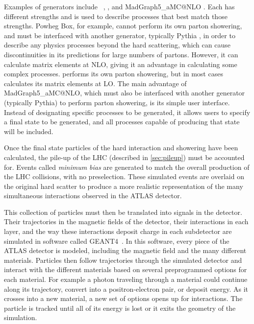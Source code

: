 Examples of generators include \sherpa~\cite{sherpa},  \cite{PowhegBOX1,PowhegBOX2,PowhegBOX3}, and {\sc MadGraph5\_aMC@NLO} \cite{Alwall:2014hca}. Each has different strengths and is used to describe processes that best match those strengths. {\sc Powheg Box}, for example, cannot perform its own parton showering, and must be interfaced with another generator, typically {\sc Pythia} \cite{Sjostrand:2006za}, in order to describe any physics processes beyond the hard scattering, which can cause discontinuities in its predictions for large numbers of partons. However, it can calculate matrix elements at \ac{NLO}, giving it an advantage in calculating some complex processes. \sherpa performs its own parton showering, but in most cases calculates its matrix elements at \ac{LO}. The main advantage of {\sc MadGraph5\_aMC@NLO}, which must also be interfaced with another generator (typically {\sc Pythia}) to perform parton showering, is its simple user interface. Instead of designating specific processes to be generated, it allows users to specify a final state to be generated, and all processes capable of producing that state will be included.

Once the final state particles of the hard interaction and showering have been calculated, the pile-up of the \ac{LHC} (described in \autoref{sec:pileup}) must be accounted for. Events called \textit{minimum bias} are generated to match the overall production of the \ac{LHC} collisions, with no preselection. These simulated events are overlaid on the original hard scatter to produce a more realistic representation of the many simultaneous interactions observed in the \ac{ATLAS} detector.

This collection of particles must then be translated into signals in the detector. Their trajectories in the magnetic fields of the detector, their interactions in each layer, and the way these interactions deposit charge in each subdetector are simulated in software called {\sc GEANT4}~\cite{Agostinelli:2002hh}. In this software, every piece of the \ac{ATLAS} detector is modeled, including the magnetic field and the many different materials. Particles then follow trajectories through the simulated detector and interact with the different materials based on several preprogrammed options for each material. For example a photon traveling through a material could continue along its trajectory, convert into a positron-electron pair, or deposit energy. As it crosses into a new material, a new set of options opens up for interactions. The particle is tracked until all of its energy is lost or it exits the geometry of the simulation.

